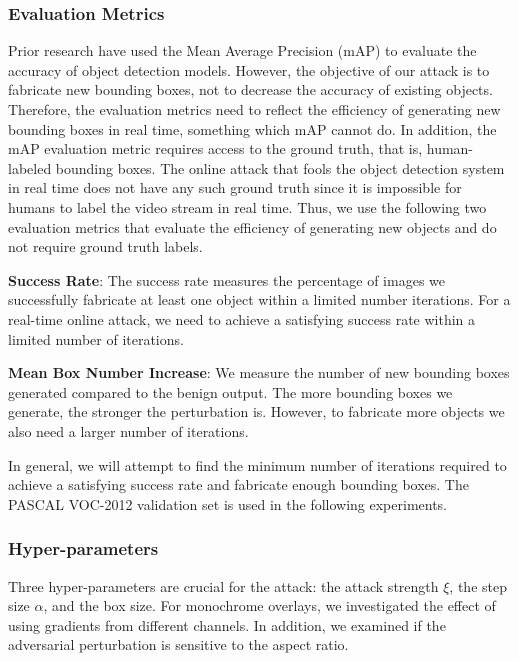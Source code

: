 \subsubsection{Evaluation Metrics}

Prior research have used the Mean Average Precision (mAP) \citep{cartucho2018} to evaluate the accuracy of object detection models. However, the objective of our attack is to fabricate new bounding boxes, not to decrease the accuracy of existing objects. Therefore, the evaluation metrics need to reflect the efficiency of generating new bounding boxes in real time, something which mAP cannot do. In addition, the mAP evaluation metric requires access to the ground truth, that is, human-labeled bounding boxes. The online attack that fools the object detection system in real time does not have any such ground truth since it is impossible for humans to label the video stream in real time. Thus, we use the following two evaluation metrics that evaluate the efficiency of generating new objects and do not require ground truth labels.

\textbf{Success Rate}: The success rate measures the percentage of images we successfully fabricate at least one object within a limited number iterations. For a real-time online attack, we need to achieve a satisfying success rate within a limited number of iterations.

\textbf{Mean Box Number Increase}: We measure the number of new bounding boxes generated compared to the benign output. The more bounding boxes we generate, the stronger the perturbation is. However, to fabricate more objects we also need a larger number of iterations.

In general, we will attempt to find the minimum number of iterations required to achieve a satisfying success rate and fabricate enough bounding boxes. The PASCAL VOC-2012 validation set is used in the following experiments.

\subsubsection{Hyper-parameters}
\label{sec:hyper}

Three hyper-parameters are crucial for the attack: the attack strength $\xi$, the step size $\alpha$, and the box size. For monochrome overlays, we investigated the effect of using gradients from different channels. In addition, we examined if the adversarial perturbation is sensitive to the aspect ratio.

